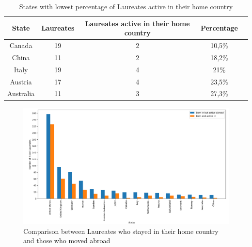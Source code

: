 \documentclass{article}
\begin{document}
\begin{table}[h!]
	\centering
	\caption{States with lowest percentage of Laureates active in their home country}
	\begin{tabular}{|c|c|c|c|c|}
		\hline
		\textbf{State} & \textbf{Laureates} & \textbf{Laureates active in their home country} & \textbf{Percentage} \\ \hline
		Canada         & 19                 & 2                                               & 10,5\%              \\ \hline
		China          & 11                 & 2                                               & 18,2\%              \\ \hline
		Italy          & 19                 & 4                                               & 21\%                \\ \hline
		Austria        & 17                 & 4                                               & 23,5\%              \\ \hline
		Australia      & 11                 & 3                                               & 27,3\%              \\ \hline
	\end{tabular}
	\label{tab:laureates_active}
\end{table}

\begin{figure}[H]
	\centering
	\includegraphics[width=\textwidth]{../queries/plots/laureatesComparison.png}
	\caption{Comparison between Laureates who stayed in their home country and those who moved abroad}
	\label{fig:laureatesComparison}
\end{figure}
\end{document}
